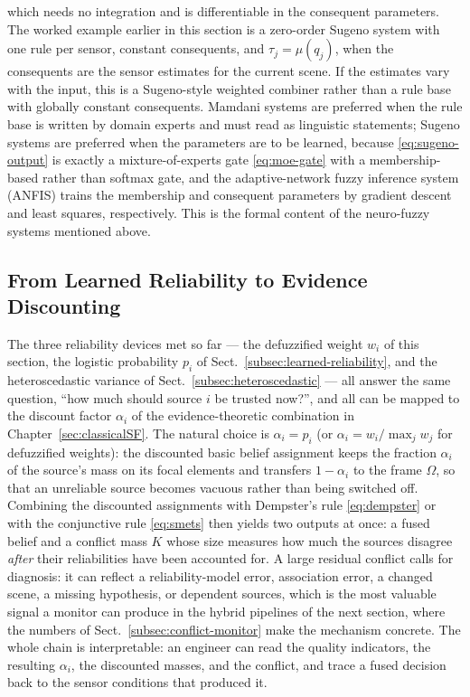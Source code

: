 which needs no integration and is differentiable in the consequent parameters. The worked example earlier in this section is a zero-order Sugeno system with one rule per sensor, constant consequents, and $\tau_j=\mu(q_j)$, when the consequents are the sensor estimates for the current scene. If the estimates vary with the input, this is a Sugeno-style weighted combiner rather than a rule base with globally constant consequents. Mamdani systems are preferred when the rule base is written by domain experts and must read as linguistic statements; Sugeno systems are preferred when the parameters are to be learned, because \eqref{eq:sugeno-output} is exactly a mixture-of-experts gate \eqref{eq:moe-gate} with a membership-based rather than softmax gate, and the adaptive-network fuzzy inference system (ANFIS) \cite{jang1993_anfis} trains the membership and consequent parameters by gradient descent and least squares, respectively. This is the formal content of the neuro-fuzzy systems mentioned above.

\subsection{From Learned Reliability to Evidence Discounting}
\label{subsec:reliability-to-discounting}
The three reliability devices met so far --- the defuzzified weight $w_i$ of this section, the logistic probability $p_i$ of Sect.~\ref{subsec:learned-reliability}, and the heteroscedastic variance of Sect.~\ref{subsec:heteroscedastic} --- all answer the same question, ``how much should source $i$ be trusted now?'', and all can be mapped to the discount factor $\alpha_i$ of the evidence-theoretic combination in Chapter~\ref{sec:classicalSF}. The natural choice is $\alpha_i=p_i$ (or $\alpha_i=w_i/\max_j w_j$ for defuzzified weights): the discounted basic belief assignment keeps the fraction $\alpha_i$ of the source's mass on its focal elements and transfers $1-\alpha_i$ to the frame $\Omega$, so that an unreliable source becomes vacuous rather than being switched off. Combining the discounted assignments with Dempster's rule \eqref{eq:dempster} or with the conjunctive rule \eqref{eq:smets} then yields two outputs at once: a fused belief and a conflict mass $K$ whose size measures how much the sources disagree \emph{after} their reliabilities have been accounted for. A large residual conflict calls for diagnosis: it can reflect a reliability-model error, association error, a changed scene, a missing hypothesis, or dependent sources, which is the most valuable signal a monitor can produce in the hybrid pipelines of the next section, where the numbers of Sect.~\ref{subsec:conflict-monitor} make the mechanism concrete. The whole chain is interpretable: an engineer can read the quality indicators, the resulting $\alpha_i$, the discounted masses, and the conflict, and trace a fused decision back to the sensor conditions that produced it.

